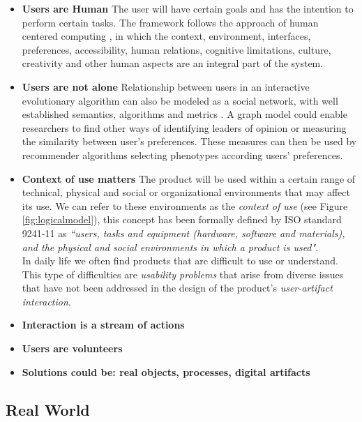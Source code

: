 \begin{itemize}
\item {\bf Users are Human} 
  The user will have certain goals and has the intention to perform certain tasks.
  The framework follows the approach of human centered computing \cite{sebe2010human},
  in which the context, environment, interfaces, preferences, accessibility, human relations, cognitive
  limitations, culture, creativity and other human aspects are an integral part of the system. 

\item {\bf Users are not alone}
  Relationship between users in an interactive evolutionary algorithm can also be modeled 
  as a social network, with well established semantics, algorithms and metrics \cite{ahuja1993network}.
  A graph model could enable researchers to find other ways of identifying leaders of 
  opinion or measuring the similarity between user's preferences. 
  These measures can then be used by recommender algorithms selecting 
  phenotypes according users' preferences. 

\item {\bf Context of use matters}
 The product will  be used within a certain range of technical, physical and social or
 organizational environments \cite{maguire2001context} that may affect its use.
 We can refer to these environments as the \textit{context of use} (see
 Figure \ref{fig:logicalmodel}), this concept has been formally defined
 by ISO standard 9241-11 \cite{international1998iso} as \textit{``users,
 tasks and equipment (hardware, software and materials), and the
 physical and social environments in which a product is used"}. \\ 
 In daily life we often find products that are difficult to use or
 understand. This type of difficulties are \textit{usability problems}
 that arise from  diverse issues that have not been addressed in the
 design of the product's \textit{user-artifact interaction}.


\item {\bf Interaction is a stream of actions}

\item {\bf Users are volunteers}

\item {\bf Solutions could be: real objects, processes, digital artifacts}  

\end{itemize}


  \subsection{Real World}
